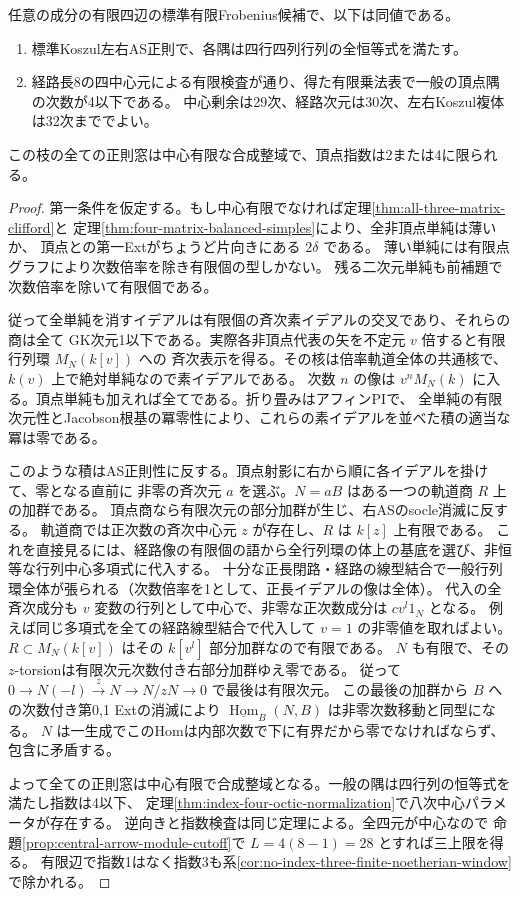 \begin{theorem}\label{thm:four-matrix-all-regular}
任意の成分の有限四辺の標準有限Frobenius候補で、以下は同値である。
\begin{enumerate}
\item 標準Koszul左右AS正則で、各隅は四行四列行列の全恒等式を満たす。
\item 経路長8の四中心元による有限検査が通り、得た有限乗法表で一般の頂点隅の次数が4以下である。
中心剰余は29次、経路次元は30次、左右Koszul複体は32次まででよい。
\end{enumerate}
この枝の全ての正則窓は中心有限な合成整域で、頂点指数は2または4に限られる。
\end{theorem}
\begin{proof}
第一条件を仮定する。もし中心有限でなければ定理\ref{thm:all-three-matrix-clifford}と
定理\ref{thm:four-matrix-balanced-simples}により、全非頂点単純は薄いか、
頂点との第一Extがちょうど片向きにある $2\delta$ である。
薄い単純には有限点グラフにより次数倍率を除き有限個の型しかない。
残る二次元単純も前補題で次数倍率を除いて有限個である。

従って全単純を消すイデアルは有限個の斉次素イデアルの交叉であり、それらの商は全て
GK次元1以下である。実際各非頂点代表の矢を不定元 $v$ 倍すると有限行列環 $M_N(k[v])$ への
斉次表示を得る。その核は倍率軌道全体の共通核で、$k(v)$ 上で絶対単純なので素イデアルである。
次数 $n$ の像は $v^n M_N(k)$ に入る。頂点単純も加えれば全てである。折り畳みはアフィンPIで、
全単純の有限次元性とJacobson根基の冪零性により、これらの素イデアルを並べた積の適当な冪は零である。

このような積はAS正則性に反する。頂点射影に右から順に各イデアルを掛けて、零となる直前に
非零の斉次元 $a$ を選ぶ。$N=aB$ はある一つの軌道商 $R$ 上の加群である。
頂点商なら有限次元の部分加群が生じ、右ASのsocle消滅に反する。
軌道商では正次数の斉次中心元 $z$ が存在し、$R$ は $k[z]$ 上有限である。
これを直接見るには、経路像の有限個の語から全行列環の体上の基底を選び、非恒等な行列中心多項式に代入する。
十分な正長閉路・経路の線型結合で一般行列環全体が張られる（次数倍率を1として、正長イデアルの像は全体）。
代入の全斉次成分も $v$ 変数の行列として中心で、非零な正次数成分は $c v^l 1_N$ となる。
例えば同じ多項式を全ての経路線型結合で代入して $v=1$ の非零値を取ればよい。
$R\subset M_N(k[v])$ はその $k[v^l]$ 部分加群なので有限である。
$N$ も有限で、その $z$-torsionは有限次元次数付き右部分加群ゆえ零である。
従って $0\to N(-l)\xrightarrow{z}N\to N/zN\to0$ で最後は有限次元。
この最後の加群から $B$ への次数付き第0,1 Extの消滅により
$\underline{\operatorname{Hom}}_B(N,B)$ は非零次数移動と同型になる。
$N$ は一生成でこのHomは内部次数で下に有界だから零でなければならず、包含に矛盾する。

よって全ての正則窓は中心有限で合成整域となる。一般の隅は四行列の恒等式を満たし指数は4以下、
定理\ref{thm:index-four-octic-normalization}で八次中心パラメータが存在する。
逆向きと指数検査は同じ定理による。全四元が中心なので
命題\ref{prop:central-arrow-module-cutoff}で $L=4(8-1)=28$ とすれば三上限を得る。
有限辺で指数1はなく指数3も系\ref{cor:no-index-three-finite-noetherian-window}で除かれる。
\end{proof}
